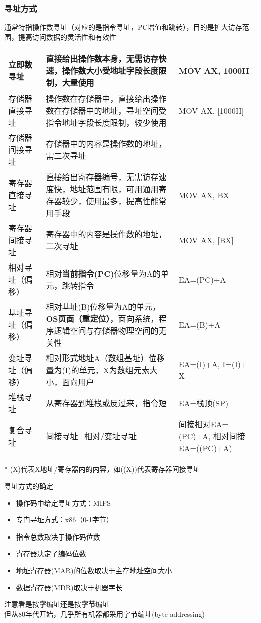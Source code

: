 \subsubsection{寻址方式}
通常特指操作数寻址（对应的是指令寻址，PC增值和跳转），目的是扩大访存范围，提高访问数据的灵活性和有效性
\begin{center}
\begin{tabular}{|m{3cm}|m{8cm}|m{4cm}|}
\hline
立即数寻址 & 直接给出操作数本身，无需访存快速，操作数大小受地址字段长度限制，大量使用 & MOV AX, 1000H\\\hline
存储器直接寻址 & 操作数在存储器中，直接给出操作数在存储器中的地址，寻址空间受指令地址字段长度限制，较少使用 & MOV AX, [1000H]\\\hline
存储器间接寻址 & 存储器中的内容是操作数的地址，需二次寻址 & \\\hline
寄存器直接寻址 & 直接给出寄存器编号，无需访存速度快，地址范围有限，可用通用寄存器较少，使用最多，提高性能常用手段 & MOV AX, BX\\\hline
寄存器间接寻址 & 寄存器中的内容是操作数的地址，二次寻址 & MOV AX, [BX]\\\hline
相对寻址（偏移） & 相对\textbf{当前指令(PC)}位移量为A的单元，跳转指令 & EA=(PC)+A\\\hline
基址寻址（偏移） & 相对基址(B)位移量为A的单元，\textbf{OS页面（重定位）}，面向系统，程序逻辑空间与存储器物理空间的无关性 & EA=(B)+A \\\hline
变址寻址（偏移） & 相对形式地址A（数组基址）位移量为(I)的单元，X为数组元素大小，面向用户 & EA=(I)+A, I=(I)$\pm$X \\\hline
堆栈寻址 & 从寄存器到堆栈或反过来，指令短 & EA=栈顶(SP)\\\hline
复合寻址 & 间接寻址+相对/变址寻址 & 间接相对EA=(PC)+A, 相对间接EA=((PC)+A)\\\hline
\end{tabular}
* (X)代表X地址/寄存器内的内容，如((X))代表寄存器间接寻址
\end{center}
寻址方式的确定
\begin{itemize}
	\item 操作码中给定寻址方式：MIPS
	\item 专门寻址方式：x86（0-1字节）
\end{itemize}
\begin{itemize}
	\item 指令总数取决于操作码位数
	\item 寄存器决定了编码位数
	\item 地址寄存器(MAR)的位数取决于主存地址空间大小
	\item 数据寄存器(MDR)取决于机器字长
\end{itemize}
注意看是按\textbf{字}编址还是按\textbf{字节}编址\\
但从80年代开始，几乎所有机器都采用字节编址(byte addressing)

